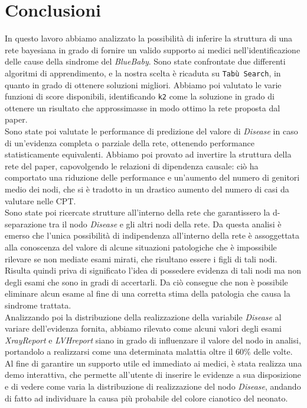 \chapter{Conclusioni}
In questo lavoro abbiamo analizzato la possibilità di inferire la struttura di una rete bayesiana in grado di fornire un valido supporto ai medici nell'identificazione delle cause della sindrome del \textit{BlueBaby}. Sono state confrontate due differenti algoritmi di apprendimento, e la nostra scelta è ricaduta su \texttt{Tabù Search}, in quanto in grado di ottenere soluzioni migliori. Abbiamo poi valutato le varie funzioni di score disponibili, identificando \texttt{k2} come la soluzione in grado di ottenere un risultato che approssimasse in modo ottimo la rete proposta dal paper.\\
Sono state poi valutate le performance di predizione del valore di \textit{Disease} in caso di un'evidenza completa o parziale della rete, ottenendo performance statisticamente equivalenti. Abbiamo poi provato ad invertire la struttura della rete del paper, capovolgendo le relazioni di dipendenza causale: ciò ha comportato una riduzione delle performance e un'aumento del numero di genitori medio dei nodi, che si è tradotto in un drastico aumento del numero di casi da valutare nelle CPT.\\
Sono state poi ricercate strutture all'interno della rete che garantissero la d-separazione tra il nodo \textit{Disease} e gli altri nodi della rete. Da questa analisi è emerso che l'unica possibilità di indipendenza all'interno della rete è assoggettata alla conoscenza del valore di alcune situazioni patologiche che è impossibile rilevare se non mediate esami mirati, che risultano essere i figli di tali nodi. Risulta quindi priva di significato l'idea di possedere evidenza di tali nodi ma non degli esami che sono in gradi di accertarli. Da ciò consegue che non è possibile eliminare alcun esame al fine di una corretta stima della patologia che causa la sindrome trattata.\\
Analizzando poi la distribuzione della realizzazione della variabile \textit{Disease} al variare dell'evidenza fornita, abbiamo rilevato come alcuni valori degli esami \textit{XrayReport} e \textit{LVHreport} siano in grado di influenzare il valore del nodo in analisi, portandolo a realizzarsi come una determinata malattia oltre il $60\%$ delle volte.\\
Al fine di garantire un supporto utile ed immediato ai medici, è stata realizza una demo interattiva, che permette all'utente di inserire le evidenze a sua disposizione e di vedere come varia la distribuzione di realizzazione del nodo \textit{Disease}, andando di fatto ad individuare la causa più probabile del colore cianotico del neonato.
